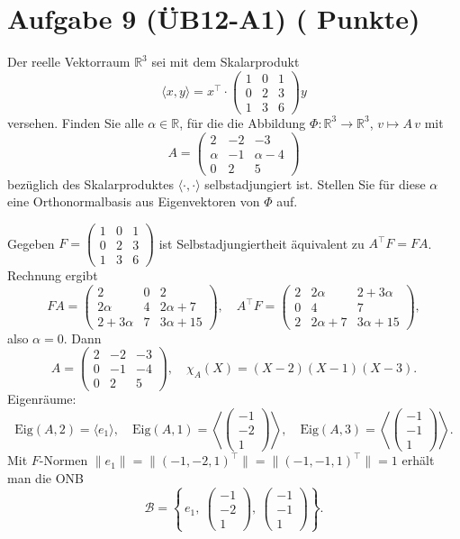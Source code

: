\documentclass[11pt, a4paper]{article}
\newcommand{\aufgabe}[2]{%
  \section*{\Large\bfseries Aufgabe #1%
  \if\relax\detokenize{#2}\relax\else \hfill\normalfont\normalsize(#2 Punkte)\fi}%
  \vspace{-1.5ex}
}
\begin{document}
\aufgabe{9 (ÜB12-A1)}{}
Der reelle Vektorraum $\mathbb{R}^3$ sei mit dem Skalarprodukt
\[
\langle x,y\rangle = x^\top\!\cdot
\begin{pmatrix}
1 & 0 & 1\\
0 & 2 & 3\\
1 & 3 & 6
\end{pmatrix} y
\]
versehen. Finden Sie alle $\alpha\in\mathbb{R}$, für die die Abbildung $\Phi:\mathbb{R}^3\to\mathbb{R}^3$, $v\mapsto A\,v$ mit
\[
A=
\begin{pmatrix}
2 & -2 & -3\\
\alpha & -1 & \alpha-4\\
0 & 2 & 5
\end{pmatrix}
\]
bezüglich des Skalarproduktes $\langle\cdot,\cdot\rangle$ selbstadjungiert ist. Stellen Sie für diese $\alpha$ eine Orthonormalbasis aus Eigenvektoren von $\Phi$ auf.
\begin{framed}
Gegeben $F=\begin{pmatrix}1&0&1\\0&2&3\\1&3&6\end{pmatrix}$ ist Selbstadjungiertheit äquivalent zu
$A^{\top}F=FA$. Rechnung ergibt
\[
FA=\begin{pmatrix}
2&0&2\\[2pt]
2\alpha&4&2\alpha+7\\[2pt]
2+3\alpha&7&3\alpha+15
\end{pmatrix},\quad
A^{\top}F=\begin{pmatrix}
2&2\alpha&2+3\alpha\\[2pt]
0&4&7\\[2pt]
2&2\alpha+7&3\alpha+15
\end{pmatrix},
\]
also $\alpha=0$. Dann
\[
A=\begin{pmatrix}2&-2&-3\\[2pt]0&-1&-4\\[2pt]0&2&5\end{pmatrix},\quad
\chi_A(X)=(X-2)(X-1)(X-3).
\]
Eigenräume:
\[
\mathrm{Eig}(A,2)=\langle e_1\rangle,\quad
\mathrm{Eig}(A,1)=\left\langle\begin{pmatrix}-1\\-2\\1\end{pmatrix}\right\rangle,\quad
\mathrm{Eig}(A,3)=\left\langle\begin{pmatrix}-1\\-1\\1\end{pmatrix}\right\rangle.
\]
Mit $F$-Normen $\|e_1\|=\|(-1,-2,1)^\top\|=\|(-1,-1,1)^\top\|=1$ erhält man die ONB
\[
\mathcal{B}=\left\{\,e_1,\ \begin{pmatrix}-1\\-2\\1\end{pmatrix},\ \begin{pmatrix}-1\\-1\\1\end{pmatrix}\right\}.
\]
\end{framed}
\end{document}
